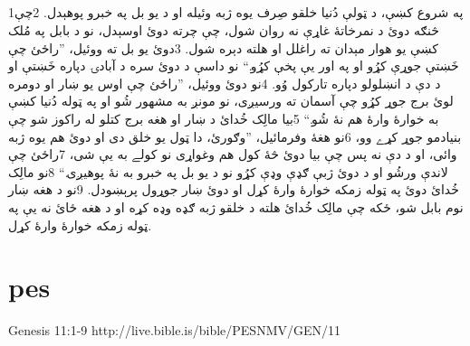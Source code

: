 \documentclass[12pt,fleqn,titlepage,twoside,a4paper]{book}
\begin{document}
\begin{arab}[utf]
\section*{}

1په شروع کښې، د ټولې دُنيا خلقو صِرف يوه ژبه وئيله او د يو بل په خبرو پوهېدل. 2چې څنګه دوئ د نمرخاتۀ غاړې نه روان شول، چې چرته دوئ اوسېدل، نو د بابل په مُلک کښې يو هوار مېدان ته راغلل او هلته دېره شول. 3دوئ يو بل ته ووئيل، ”راځئ چې خَښتې جوړې کړُو او په اور يې پخې کړُو.“ نو داسې د دوئ سره د آبادۍ دپاره خَښتې او د دې د انښلولو دپاره تارکول وُو. 4نو دوئ ووئيل، ”راځئ چې اوس يو ښار او دومره لوئ برج جوړ کړُو چې آسمان ته ورسيږى، نو مونږ به مشهور شُو او په ټوله دُنيا کښې به خوارۀ وارۀ هم نۀ شُو.“ 5بيا مالِک خُدائ د ښار او هغه برج کتلو له راکوز شو چې بنيادمو جوړ کړے وو، 6نو هغۀ وفرمائيل، ”وګورئ، دا ټول يو خلق دى او دوئ هم يوه ژبه وائى، او د دې نه پس چې بيا دوئ څۀ کول هم وغواړى نو کولے به يې شى، 7راځئ چې لاندې ورشُو او د دوئ ژبې ګډې وډې کړُو نو د يو بل په خبرو به نۀ پوهيږى.“ 8نو مالِک خُدائ دوئ په ټوله زمکه خوارۀ وارۀ کړل او دوئ ښار جوړول پرېښودل. 9نو د هغه ښار نوم بابل شو، ځکه چې مالِک خُدائ هلته د خلقو ژبه ګډه وډه کړه او د هغه ځائ نه يې په ټوله زمکه خوارۀ وارۀ کړل.

\end{arab}

\section{pes}

Genesis 11:1-9 http://live.bible.is/bible/PESNMV/GEN/11
\end{document}
